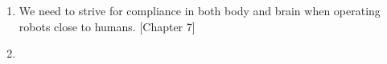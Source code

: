 \documentclass{propositions}
\begin{document}
\begin{enumerate}
    \item %
    We need to strive for compliance in both body and brain when operating robots close to humans.
    [Chapter 7]
    \item %

\end{enumerate}
\end{document}
